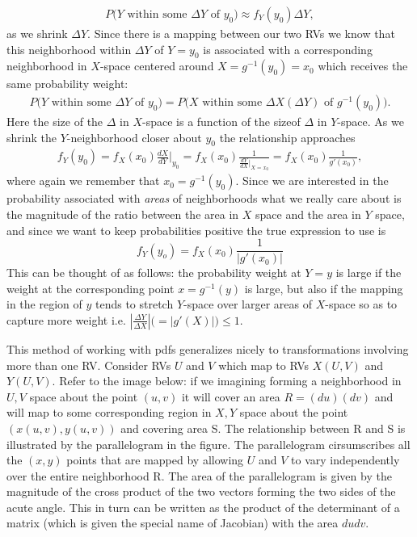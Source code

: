 \begin{align*}
P\bigg(\textrm{$Y$ within some $\Delta Y$ of $y_0$}\bigg) \approx f_Y(y_0)\Delta Y,
\end{align*}
as we shrink $\Delta Y$. Since there is a mapping between our two RVs we know that this neighborhood within $\Delta Y$ of $Y=y_0$ is associated with a corresponding neighborhood in $X$-space centered around $X=g^{-1}(y_0)=x_0$ which receives the same probability weight:
\begin{align*}
P\bigg(\textrm{$Y$ within some $\Delta Y$ of $y_0$}\bigg) = P\bigg(\textrm{$X$ within some $\Delta X(\Delta Y)$ of $g^{-1}(y_0)$}\bigg).
\end{align*}
Here the size of the $\Delta$ in $X$-space is a function of the sizeof $\Delta$ in $Y$-space. As we shrink the $Y$-neighborhood closer about $y_0$ the relationship approaches
\begin{align*}
f_Y(y_0)=f_X(x_0)\frac{dX}{dY}\bigg|_{y_0} = f_X(x_0)\frac{1}{\frac{dY}{dX}\bigg|_{X=x_0}} = f_X(x_0)\frac{1}{g'(x_0)},
\end{align*}
where again we remember that $x_0 = g^{-1}(y_0)$. Since we are interested in the probability associated with \textit{areas} of neighborhoods what we really care about is the magnitude of the ratio between the area in $X$ space and the area in $Y$ space, and since we want to keep probabilities positive the true expression to use is
\begin{equation}
f_Y(y_o) = f_X(x_0)\frac{1}{|g'(x_0)|}
\end{equation}
This can be thought of as follows: the probability weight at $Y=y$ is large if the weight at the corresponding point $x=g^{-1}(y)$ is large, but also if the mapping in the region of $y$ tends to stretch $Y$-space over larger areas of $X$-space so as to capture more weight i.e. $|\frac{\Delta Y}{\Delta X}|\big(=|g'(X)|\big) \leq 1$.
\n

This method of working with pdfs generalizes nicely to transformations involving more than one RV. Consider RVs $U$ and $V$ which map to RVs $X(U,V)$ and $Y(U,V)$. Refer to the image below: if we imagining forming a neighborhood in $U,V$ space about the point $(u,v)$ it will cover an area $R=(du)(dv)$ and will map to some corresponding region in $X,Y$ space about the point $(x(u,v),y(u,v))$ and covering area S. The relationship between R and S is illustrated by the parallelogram in the figure. The parallelogram cirsumscribes all the $(x,y)$ points that are mapped by allowing $U$ and $V$ to vary independently over the entire neighborhood R. The area of the parallelogram is given by the magnitude of the cross product of the two vectors forming the two sides of the acute angle. This in turn can be written as the product of the determinant of a matrix (which is given the special name of Jacobian) with the area $dudv$.

